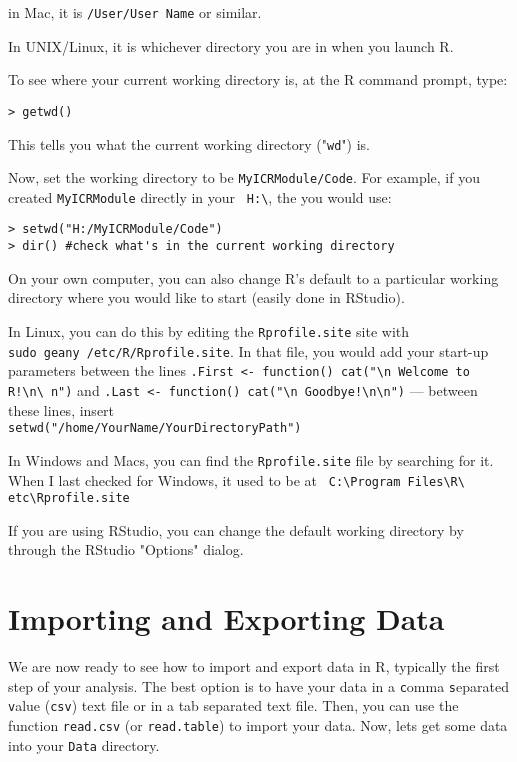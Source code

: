 in Mac, it is {\tt /User/User Name} or similar.

In UNIX/Linux, it is whichever directory you are in when you launch R.

To see where your current working directory is, at the R command 
prompt, type:
\begin{lstlisting}
> getwd() 
\end{lstlisting}
This tells you what the current working directory ("{\tt wd}") is. 

Now, set the working directory to be {\tt MyICRModule/Code}. For 
example, if you created {\tt MyICRModule} directly in your {\tt 
H:\textbackslash }, the you would use:
\begin{lstlisting}
> setwd("H:/MyICRModule/Code") 
> dir() #check what's in the current working directory
\end{lstlisting}
On your own computer, you can also change R's default to a particular 
working directory where you would like to start (easily done in RStudio). 

In Linux, you can do this by editing the {\tt Rprofile.site} site with 
\\ {\tt sudo geany /etc/R/Rprofile.site}. In that file, you would add 
your start-up parameters between the lines {\tt .First <- function() 
cat("\textbackslash n   Welcome to R!\textbackslash n\textbackslash 
n")} and {\tt .Last <- function() cat("\textbackslash n   
Goodbye!\textbackslash n\textbackslash n")} --- between these lines, 
insert \\{\tt setwd("/home/YourName/YourDirectoryPath")}

In Windows and Macs, you can find the {\tt Rprofile.site} file by 
searching for it. When I last checked for Windows, it used to be at {\tt 
C:\textbackslash Program Files\textbackslash R\textbackslash 
etc\textbackslash Rprofile.site }

If you are using RStudio, you can change the default working directory 
by through the RStudio "Options" dialog.

\section{Importing and Exporting Data}
We are now ready to see how to import and export data in R, typically 
the first step of your analysis. The best option is to have your data 
in a {\tt c}omma {\tt s}eparated {\tt v}alue ({\tt csv}) text file or 
in a tab separated text file. Then, 
you can use the function {\tt read.csv} (or {\tt read.table}) to import 
your data. Now, lets get some data into your {\tt Data} directory.

